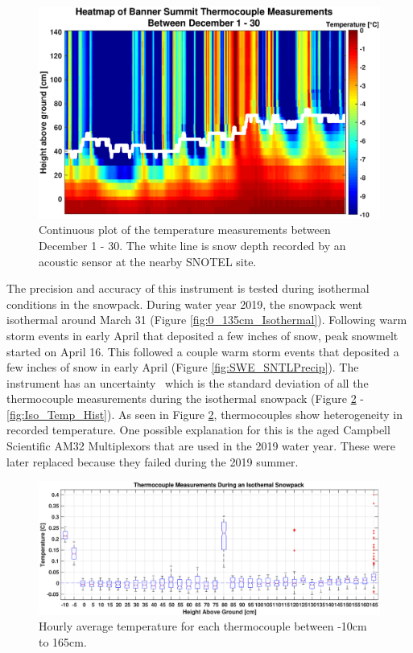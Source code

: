 \begin{figure}[H]
    \centering
    \includegraphics[width=0.9\linewidth]{figures/TCArray/Dec1_30Heatmap.eps}
    \caption{Continuous plot of the temperature measurements between December 1 - 30. The white line is  snow depth recorded by an acoustic sensor at the nearby SNOTEL site. }
    \label{fig:Dec_Jan_ImageSC}
 \end{figure}

The precision and accuracy of this instrument is tested during isothermal conditions in the snowpack. During water year 2019, the snowpack went isothermal around March 31 (Figure \ref{fig:0_135cm_Isothermal}). Following warm storm events in early April that deposited a few inches of snow, peak snowmelt started on April 16. This followed a couple warm storm events that deposited a few inches of snow in early April (Figure \ref{fig:SWE_SNTLPrecip}). The instrument has an uncertainty \isostd \ which is the standard deviation of all the thermocouple measurements during the isothermal snowpack (Figure \ref{fig:IsothermBoxplot} - \ref{fig:Iso_Temp_Hist}). As seen in Figure \ref{fig:IsothermBoxplot}, thermocouples show heterogeneity in recorded temperature. One possible explanation for this is the aged Campbell Scientific AM32 Multiplexors that are used in the 2019 water year. These were later replaced because they failed during the 2019 summer.  

\begin{figure}
    \includegraphics[width=1\linewidth]{figures/TCArray/Isothermal_Boxplot.eps}
    \caption{Hourly average temperature for each thermocouple between -10cm to 165cm.}
    \label{fig:IsothermBoxplot}
 \end{figure}

